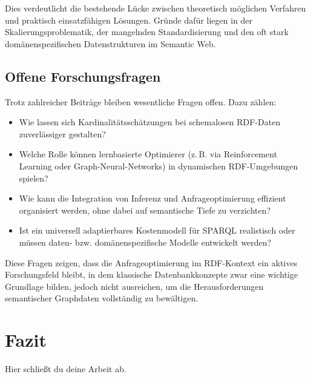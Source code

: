 \documentclass[12pt]{article}
\begin{document}
Dies verdeutlicht die bestehende Lücke zwischen theoretisch möglichen Verfahren und praktisch einsatzfähigen Lösungen. Gründe dafür liegen in der Skalierungsproblematik, der mangelnden Standardisierung und den oft stark domänenspezifischen Datenstrukturen im Semantic Web.

\subsection{Offene Forschungsfragen}

Trotz zahlreicher Beiträge bleiben wesentliche Fragen offen. Dazu zählen:
\begin{itemize}
    \item Wie lassen sich Kardinalitätsschätzungen bei schemalosen RDF-Daten zuverlässiger gestalten?
    \item Welche Rolle können lernbasierte Optimierer (z.\,B. via Reinforcement Learning oder Graph-Neural-Networks) in dynamischen RDF-Umgebungen spielen?
    \item Wie kann die Integration von Inferenz und Anfrageoptimierung effizient organisiert werden, ohne dabei auf semantische Tiefe zu verzichten?
    \item Ist ein universell adaptierbares Kostenmodell für SPARQL realistisch oder müssen daten- bzw. domänenspezifische Modelle entwickelt werden?
\end{itemize}

Diese Fragen zeigen, dass die Anfrageoptimierung im RDF-Kontext ein aktives Forschungsfeld bleibt, in dem klassische Datenbankkonzepte zwar eine wichtige Grundlage bilden, jedoch nicht ausreichen, um die Herausforderungen semantischer Graphdaten vollständig zu bewältigen.


\section{Fazit}
Hier schließt du deine Arbeit ab.

\printbibliography
\end{document}
